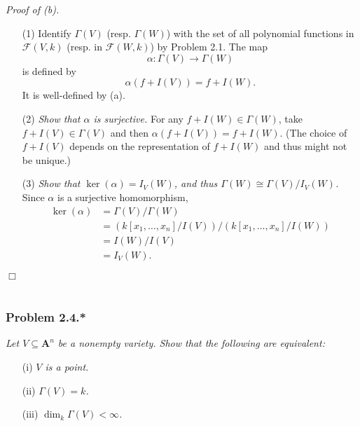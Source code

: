 \documentclass{article}
\begin{document}
\emph{Proof of (b).}
\begin{enumerate}
\item[(1)]
  Identify $\Gamma(V)$ (resp. $\Gamma(W)$) with
  the set of all polynomial functions in $\mathscr{F}(V,k)$
  (resp. in $\mathscr{F}(W,k)$) by Problem 2.1.
  The map
  \[
    \alpha: \Gamma(V) \to \Gamma(W)
  \]
  is defined by
  \[
    \alpha(f + I(V)) = f + I(W).
  \]
  It is well-defined by (a).

\item[(2)]
  \emph{Show that $\alpha$ is surjective.}
  For any $f + I(W) \in \Gamma(W)$, take $f + I(V) \in \Gamma(V)$
  and then $\alpha(f + I(V)) = f + I(W)$.
  (The choice of $f + I(V)$ depends on the representation of $f + I(W)$
  and thus might not be unique.)

\item[(3)]
  \emph{Show that $\ker(\alpha) = I_V(W)$, and thus $\Gamma(W) \cong \Gamma(V)/I_V(W)$.}
  Since $\alpha$ is a surjective homomorphism,
  \begin{align*}
    \ker(\alpha)
    &= \Gamma(V)/\Gamma(W) \\
    &= (k[x_1,\ldots,x_n]/I(V))/(k[x_1,\ldots,x_n]/I(W)) \\
    &= I(W)/I(V) \\
    &= I_V(W).
  \end{align*}
\end{enumerate}
$\Box$ \\\\






\subsubsection*{Problem 2.4.*}
\emph{Let $V \subseteq \mathbf{A}^n$ be a nonempty variety.
Show that the following are equivalent:}
\begin{enumerate}
\item[(i)]
  \emph{$V$ is a point.}
\item[(ii)]
  \emph{$\Gamma(V) = k$.}
\item[(iii)]
  \emph{$\dim_k \Gamma(V) < \infty$.} \\
\end{enumerate}
\end{document}
